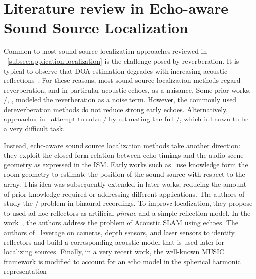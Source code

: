 

\section{Literature review in Echo-aware Sound Source Localization}
Common to most sound source localization approaches reviewed in ~\cref{subsec:application:localization} is the challenge posed by reverberation.
It is typical to observe that \acf{DOA} estimation degrades with increasing acoustic reflections~.
For these reasons, most sound source localization methods regard reverberation, and in particular acoustic echoes, as a nuisance.
Some prior works, \eg/, , modeled the reverberation as a noise term.
However, the commonly used dereverberation methods do not reduce strong early echoes.
Alternatively, approaches in~ attempt to solve \SSL/ by estimating the full \RIRs/, which is known to be a very difficult task.

\mynewline
Instead, echo-aware sound source localization methods take another direction:
they exploit the closed-form relation between echo timings and the audio scene geometry as expressed in the \acf{ISM}.
Early works such as~ use knowledge form the room geometry to estimate the position of the sound source with respect to the array.
This idea was subsequently extended in later works, reducing the amount of prior knowledge required or addressing different applications.
The authors of  study the \SSL/ problem in binaural recordings.
To improve localization, they propose to used ad-hoc reflectors as artificial \textit{pinnae} and a simple reflection model.
In the work~, the authors address the problem of Acoustic \ac{SLAM} using echoes.
The authors of~ leverage on cameras, depth sensors, and laser sensors to identify reflectors and build a corresponding acoustic model that is used later for localizing sources.
Finally, in a very recent work, the well-known \ac{MUSIC} framework is modified to account for an echo model in the spherical harmonic representation~

